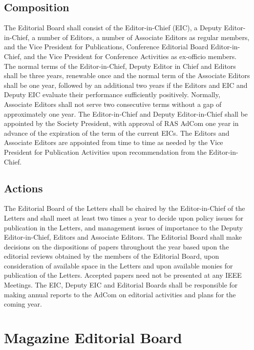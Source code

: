 \documentclass[10pt]{article}
\begin{document}
\subsection{Composition}
\label{LEB:Composition}

The Editorial Board shall consist of the Editor-in-Chief (EIC), a Deputy Editor-in-Chief, a number of Editors, a number of Associate Editors as regular members, and the Vice President for Publications, Conference Editorial Board Editor-in-Chief, and the Vice President for Conference Activities as ex-officio members.  The normal terms of the Editor-in-Chief, Deputy Editor in Chief and Editors shall be three years, renewable once and the normal term of the Associate Editors shall be one year, followed by an additional two years if the Editors and EIC and Deputy EIC evaluate their performance sufficiently positively. Normally, Associate Editors shall not serve two consecutive terms without a gap of approximately one year.  The Editor-in-Chief and Deputy Editor-in-Chief shall be appointed by the Society President, with approval of RAS AdCom one year in advance of the expiration of the term of the current EICs. The Editors and Associate Editors are appointed from time to time as needed by the Vice President for Publication Activities upon recommendation from the Editor-in-Chief.


\subsection{Actions}

The Editorial Board of the Letters shall be chaired by the Editor-in-Chief of the Letters and shall meet at least two times a year to decide upon policy issues for publication in the Letters, and management issues of importance to the Deputy Editor-in-Chief, Editors and Associate Editors.  The Editorial Board shall make decisions on the dispositions of papers throughout the year based upon the editorial reviews obtained by the members of the Editorial Board, upon consideration of available space in the Letters and upon available monies for publication of the Letters.  Accepted papers need not be presented at any IEEE Meetings. The EIC, Deputy EIC and Editorial Boards shall be responsible for making annual reports to the AdCom on editorial activities and plans for the coming year.


\section{Magazine Editorial Board}
\end{document}
